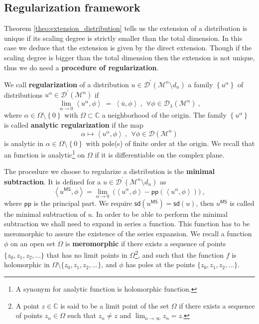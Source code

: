 \documentclass[11pt]{book}
\newcommand{\pp}{\mathsf{pp}}
\newcommand{\sd}{\mathsf{sd}}
\newcommand{\sm}[1]{\left\langle#1\right\rangle}
\newcommand{\Dcal}{\mathcal{D}}
\newcommand{\Mcal}{\mathcal{M}}
\newcommand{\Cbb}{\mathbb{C}}
\theoremstyle{break}
\begin{document}
\subsection{Regularization framework}
\label{p:REG_FRAMEWORK}


Theorem \ref{theo:extension_distribution} tells us the extension of a distribution is unique if its scaling degree is strictly smaller than the total dimension. In this case we deduce that the extension is given by the direct extension. Though if the scaling degree is bigger than the total dimension then the extension is not unique, thus we do need a \textbf{procedure of regularization}.


\bigskip


We call \textbf{regularization} of a distribution $u \in \Dcal^\prime(\Mcal^n\setminus d_n)$ a family $\left\{ u^{\alpha}\right\}$ of distributions $u^{\alpha}\in\Dcal^\prime(\Mcal^n)$ if
%
\begin{equation*}
\lim_{\alpha \to 0} \sm{u^{\alpha},\phi} \ = \ \sm{\overline{u},\phi} \ , \ \ \forall \phi \in \Dcal_{\lambda}(\Mcal^n) \ , 
\end{equation*}
%
where $\alpha \in \Omega\setminus\left\{ 0\right\}$ with $\Omega\subset\mathbb{C}$ a neighborhood of the origin. The family $\left\{ u^{\alpha}\right\}$ is called \textbf{analytic regularization} if the map 
% 
\begin{equation*}
\alpha \mapsto \sm{u^{\alpha},\phi} \ , \ \ \forall \phi \in \Dcal(\Mcal^n)
\end{equation*}
%
is analytic in $\alpha\in\Omega\setminus\left\{ 0\right\}$ with pole(s) of finite order at the origin. We recall that an function is analytic\footnote{A synonym for analytic function is holomorphic function.} on $\Omega$ if it is differentiable on the complex plane.  
 
 
The procedure we choose to regularize a distribution is the \textbf{minimal subtraction}. It is defined for a $u \in \Dcal^\prime(\Mcal^n \setminus d_n)$ as 
%
\begin{equation*}
\sm{u^{\mathsf{MS}},\phi} = \lim_{\alpha \to 0} \ \bigg( \sm{u^\alpha , \phi} - \pp\left(\sm{u^\alpha , \phi}\right) \bigg) \ ,
\end{equation*}
%
where $\pp$ is the principal part. We require $\sd(u^{\mathsf{MS}}) = \sd(u)$, then $u^{\mathsf{MS}}$ is called the minimal subtraction of $u$. In order to be able to perform the minimal subtraction we shall need to expand in series a function. This function has to be meromorphic to assure the existence of the series expansion. We recall a function $\phi$ on an open set $\Omega$ is \textbf{meromorphic} if there exists a sequence of points $\{z_0 , z_1 , z_2 , \dots \}$ that has no limit points in $\Omega$\footnote{A point $z \in \Cbb$ is said to be a limit point of the set $\Omega$ if there exists a sequence of points $z_n \in \Omega$ such that $z_n \neq z$ and $\lim_{n \to \infty} z_n = z$.}, and such
that the function $f$ is holomorphic in $\Omega \setminus \{z_0 , z_1 , z_2 , \dots \}$, and $\phi$ has poles at the points $\{z_0 , z_1 , z_2 , \dots \}$.
\end{document}
